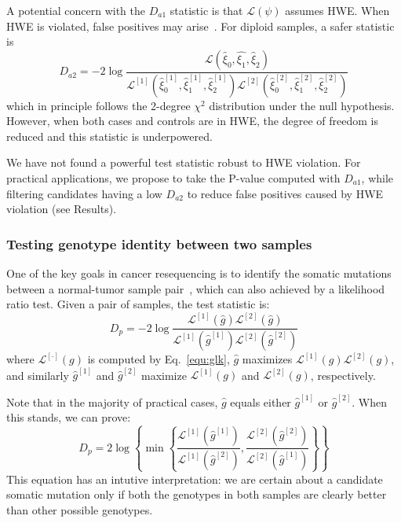 \documentclass{bioinfo}
\begin{document}
\begin{methods}
A potential concern with the $D_{a1}$ statistic is that $\mathcal{L}(\psi)$ assumes HWE.
When HWE is violated, false positives may arise~\citep{Nielsen:2011fk}. For diploid samples, a safer statistic is
$$
D_{a2}=-2\log\frac{\mathcal{L}(\hat{\xi}_0,\hat{\xi_1},\hat{\xi}_2)}
{\mathcal{L}^{[1]}(\hat{\xi}_0^{[1]},\hat{\xi}_1^{[1]},\hat{\xi}_2^{[1]})\mathcal{L}^{[2]}(\hat{\xi}_0^{[2]},\hat{\xi}_1^{[2]},\hat{\xi}_2^{[2]})}
$$
which in principle follows the 2-degree $\chi^2$ distribution under the null hypothesis.
However, when both cases and controls are in HWE, the degree of freedom is reduced and this
statistic is underpowered.

We have not found a powerful test statistic robust to HWE violation. For
practical applications, we propose to take the P-value computed with $D_{a1}$, while
filtering candidates having a low $D_{a2}$ to reduce false positives caused
by HWE violation (see Results).

\subsubsection{Testing genotype identity between two samples}
One of the key goals in cancer resequencing is to identify the somatic mutations
between a normal-tumor sample pair~\citep{Robison:2010ys}, which can also achieved by a likelihood ratio test.
Given a pair of samples, the test statistic is:
\begin{equation}
D_p=-2\log\frac{\mathcal{L}^{[1]}(\hat{g})\mathcal{L}^{[2]}(\hat{g})}{\mathcal{L}^{[1]}(\hat{g}^{[1]})\mathcal{L}^{[2]}(\hat{g}^{[2]})}
\end{equation}
where $\mathcal{L}^{[\cdot]}(g)$ is computed by Eq.~\eqref{equ:glk}, $\hat{g}$
maximizes $\mathcal{L}^{[1]}(g)\mathcal{L}^{[2]}(g)$, and similarly $\hat{g}^{[1]}$
and $\hat{g}^{[2]}$ maximize $\mathcal{L}^{[1]}(g)$ and $\mathcal{L}^{[2]}(g)$, respectively.

Note that in the majority of practical cases, $\hat{g}$ equals either $\hat{g}^{[1]}$ or $\hat{g}^{[2]}$.
When this stands, we can prove:
$$
D_p=2\log\left\{ \min\left\{\frac{\mathcal{L}^{[1]}(\hat{g}^{[1]})}{\mathcal{L}^{[1]}(\hat{g}^{[2]})},\frac{\mathcal{L}^{[2]}(\hat{g}^{[2]})}{\mathcal{L}^{[2]}(\hat{g}^{[1]})}\right\}\right\}
$$
This equation has an intutive interpretation: we are certain about
a candidate somatic mutation only if both the genotypes in both samples
are clearly better than other possible genotypes.


\end{methods}
\end{document}
